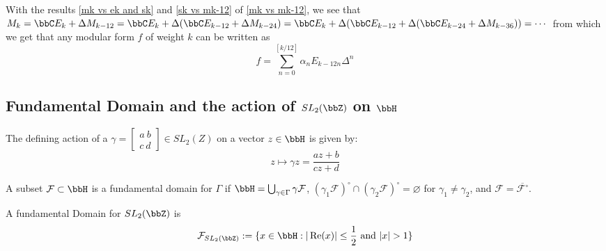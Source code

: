 \begin{remark}
  With the results \ref{mk vs ek and sk} and \ref{sk vs mk-12} of \ref{mk vs mk-12}, we see that $M_k=\bbC E_k+\Delta M_{k-12}=\bbC E_k+\Delta (\bbC E_{k-12}+\Delta M_{k-24})=\bbC E_k+\Delta (\bbC E_{k-12} + \Delta(\bbC E_{k-24}+\Delta M_{k-36}))=\cdots $ from which we get that any modular form $f$ of weight $k$ can be written as $$ f=\sum_{n=0}^{[k/12]}\alpha_n E_{k-12n} \Delta^n$$
\end{remark}
\subsection{Fundamental Domain and the action of $SL_2(\bbZ)$ on $\bbH $}
The defining action of a $\gamma=\begin{bmatrix}
  a \ b \\ c \ d  
\end{bmatrix} \in SL_2(Z)$ on a vector $z \in \bbH $ is given by: $$ z \mapsto \gamma z=\frac{az+b}{cz+d}$$


\begin{definition}
A subset $\mathcal{F}\subset\bbH$ is a fundamental domain for $\Gamma$ \cite{PrasadNotes} if $\bbH=\bigcup_{\gamma\in\Gamma}\gamma\mathcal{F}$, $(\gamma_1\mathcal{F})^\circ\cap(\gamma_2\mathcal{F})^\circ=\varnothing$ for $\gamma_1\neq\gamma_2$, and $\mathcal{F}=\overline{\mathcal{F}^\circ}$.
\end{definition}

\begin{example}
  A fundamental Domain for $SL_2(\bbZ)$ is $$\mathcal F_{SL_2(\bbZ)}:=\{x \in \bbH: |\operatorname{Re}(x)|\leq \frac{1}{2} \text{ and }|x|>1 \} $$
\end{example}

